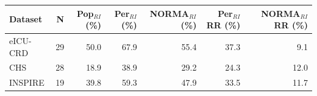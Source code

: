 \begin{table}[ht]
\centering
\footnotesize
\begin{tabular}{lrrrrrr}
\toprule
Dataset & N & Pop$_{RI}$ (\%) & Per$_{RI}$ (\%) & NORMA$_{RI}$ (\%) & Per$_{RI}$ RR (\%) & NORMA$_{RI}$ RR (\%) \\
\midrule
eICU-CRD & 29 & 50.0 & 67.9 & 55.4 & 37.3 & 9.1 \\
CHS & 28 & 18.9 & 38.9 & 29.2 & 24.3 & 12.0 \\
INSPIRE & 19 & 39.8 & 59.3 & 47.9 & 33.5 & 11.7 \\
\bottomrule
\end{tabular}
\label{tab:07_prevalence}
\end{table}